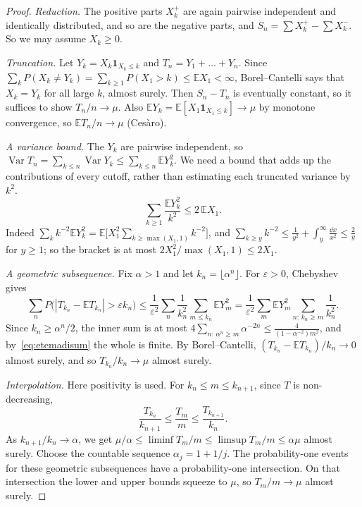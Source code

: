 \begin{proof}
\emph{Reduction.} The positive parts $X_k^+$ are again pairwise independent and identically distributed, and so are the negative parts, and
$S_n=\sum X_k^+-\sum X_k^-$. So we may assume $X_k\ge0$.

\emph{Truncation.} Let $Y_k=X_k\mathbf 1_{X_k\le k}$ and $T_n=Y_1+\dots+Y_n$. Since $\sum_kP(X_k\ne Y_k)=\sum_{k\ge1}P(X_1>k)\le\mathbb E X_1<\infty$,
Borel--Cantelli says that $X_k=Y_k$ for all large $k$, almost surely. Then $S_n-T_n$ is eventually constant, so it suffices to show
$T_n/n\to\mu$. Also $\mathbb E Y_k=\mathbb E[X_1\mathbf 1_{X_1\le k}]\to\mu$ by monotone convergence, so $\mathbb E T_n/n\to\mu$ (Ces\`aro).

\emph{A variance bound.} The $Y_k$ are pairwise independent, so $\operatorname{Var}T_n=\sum_{k\le n}\operatorname{Var}Y_k\le\sum_{k\le n}\mathbb E Y_k^2$.
We need a bound that adds up the contributions of every cutoff, rather than estimating each truncated variance by $k^2$.
\begin{equation}\label{eq:etemadisum}
\sum_{k\ge1}\frac{\mathbb E Y_k^2}{k^2}\le2\,\mathbb E X_1.
\end{equation}
Indeed $\sum_kk^{-2}\mathbb E Y_k^2=\mathbb E\bigl[X_1^2\sum_{k\ge\max(X_1,1)}k^{-2}\bigr]$, and $\sum_{k\ge y}k^{-2}\le\frac1{y^2}+\int_y^\infty
\frac{\dd x}{x^2}\le\frac2y$ for $y\ge1$; so the bracket is at most $2X_1^2/\max(X_1,1)\le2X_1$.

\emph{A geometric subsequence.} Fix $\alpha>1$ and let $k_n=\lfloor\alpha^n\rfloor$. For $\varepsilon>0$, Chebyshev gives
\[
\sum_nP\bigl(|T_{k_n}-\mathbb E T_{k_n}|>\varepsilon k_n\bigr)\le\frac1{\varepsilon^2}\sum_n\frac1{k_n^2}\sum_{m\le k_n}\mathbb E Y_m^2=
\frac1{\varepsilon^2}\sum_m\mathbb E Y_m^2\sum_{n:\,k_n\ge m}\frac1{k_n^2}.
\]
Since $k_n\ge\alpha^n/2$, the inner sum is at most $4\sum_{n:\,\alpha^n\ge m}\alpha^{-2n}\le\frac{4}{(1-\alpha^{-2})m^2}$, and by~\eqref{eq:etemadisum}
the whole is finite. By Borel--Cantelli, $(T_{k_n}-\mathbb E T_{k_n})/k_n\to0$ almost surely, and so $T_{k_n}/k_n\to\mu$ almost surely.

\emph{Interpolation.} Here positivity is used. For $k_n\le m\le k_{n+1}$, since $T$ is non-decreasing,
\[
\frac{T_{k_n}}{k_{n+1}}\le\frac{T_m}m\le\frac{T_{k_{n+1}}}{k_n}.
\]
As $k_{n+1}/k_n\to\alpha$, we get $\mu/\alpha\le\liminf T_m/m\le\limsup T_m/m\le\alpha\mu$ almost surely. Choose the countable sequence $\alpha_j=1+1/j$. The probability-one events for these geometric subsequences have a probability-one intersection. On that intersection the lower and upper bounds squeeze to $\mu$, so $T_m/m\to\mu$ almost surely.
\end{proof}

